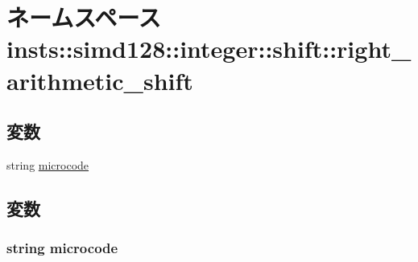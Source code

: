 \hypertarget{namespaceinsts_1_1simd128_1_1integer_1_1shift_1_1right__arithmetic__shift}{
\section{ネームスペース insts::simd128::integer::shift::right\_\-arithmetic\_\-shift}
\label{namespaceinsts_1_1simd128_1_1integer_1_1shift_1_1right__arithmetic__shift}
}
\subsection*{変数}
\begin{DoxyCompactItemize}
\item 
string \hyperlink{namespaceinsts_1_1simd128_1_1integer_1_1shift_1_1right__arithmetic__shift_a770f11a173e99389a8802f0107ed8f52}{microcode}
\end{DoxyCompactItemize}


\subsection{変数}
\hypertarget{namespaceinsts_1_1simd128_1_1integer_1_1shift_1_1right__arithmetic__shift_a770f11a173e99389a8802f0107ed8f52}{
\subsubsection[{microcode}]{\setlength{\rightskip}{0pt plus 5cm}string {\bf microcode}}}
\label{namespaceinsts_1_1simd128_1_1integer_1_1shift_1_1right__arithmetic__shift_a770f11a173e99389a8802f0107ed8f52}
